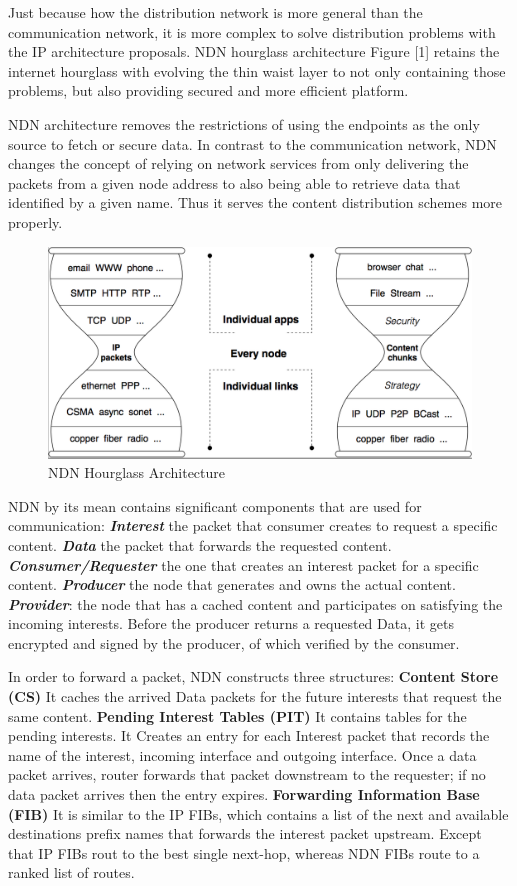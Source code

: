 \documentclass[conference]{IEEEtran}
\begin{document}
Just because how the distribution network is more general than the communication network, it is more complex to solve distribution problems with the IP architecture proposals. NDN hourglass architecture Figure [1] retains the internet hourglass with evolving the thin waist layer to not only containing those problems, but also providing secured and more efficient platform.

NDN architecture removes the restrictions of using the endpoints as the only source to fetch or secure data. In contrast to the communication network, NDN changes the concept of relying on network services from only delivering the packets from a given node address to also being able to retrieve data that identified by a given name. Thus it serves the content distribution schemes more properly.
\begin{figure} [ht]
    \centering
    \includegraphics[width=\columnwidth]{hourglass.png}
    \caption{ \small NDN Hourglass Architecture}
    \label{fig:my_label}
\end{figure}

NDN by its mean contains significant components that are used for communication: \textbf{\textit{Interest}} the packet that consumer creates to request a specific content. \textbf{\textit{Data}} the packet that forwards the requested content. \textbf{\textit{Consumer/Requester}} the one that creates an interest packet for a specific content. \textbf{\textit{Producer}} the node that generates and owns the actual content. \textbf{\textit{Provider}}: the node that has a cached content and participates on satisfying the incoming interests. Before the producer returns a requested Data, it gets encrypted and signed by the producer, of which verified by the consumer. 


In order to forward a packet, NDN constructs three structures\cite{Zhang:2014:NDN:2656877.2656887}: \textbf{Content Store (CS)} It caches the arrived Data packets for the future interests that request the same content. \textbf{Pending Interest Tables (PIT)} It contains tables for the pending interests. It Creates an entry for each Interest packet that records the name of the interest, incoming interface and outgoing interface. Once a data packet arrives, router forwards that packet downstream to the requester; if no data packet arrives then the entry expires. \textbf{Forwarding Information Base (FIB)} It is similar to the IP FIBs, which contains a list of the next and available destinations prefix names that forwards the interest packet upstream. Except that IP FIBs rout to the best single next-hop, whereas NDN FIBs route to a ranked list of routes.
\end{document}
